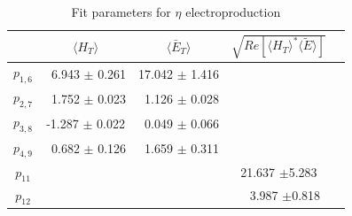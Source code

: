 \documentclass[prc,floatfix,superscriptaddress]{revtex4}
\newcommand{\GPDtE}{\langle \tilde{E} \rangle}
\newcommand{\GPDHT}{\langle H_T \rangle}
\newcommand{\ETbar}{\langle \bar{E}_T \rangle}
\begin{document}
\begin{table}[h!]
\caption{Fit parameters for $\eta$ electroproduction}
\begin{tabular}{   | c | c | c |  c | c |}
\hline
                  &  $\GPDHT$                  & $ \ETbar$ &  $\sqrt{Re[\GPDHT^*\GPDtE]}$    \\
\hline
$p_{1,6}$  & \ 6.943 $\pm$ 0.261  & 17.042  $\pm$ 1.416 &    \\
$p_{2,7}$  &\  1.752  $\pm$ 0.023& \ 1.126  $\pm$ 0.028&    \\
$p_{3,8}$   & -1.287  $\pm$ 0.022& \  0.049 $\pm$ 0.066&    \\
$p_{4,9}$  & \  0.682 $\pm$ 0.126 &\  1.659  $\pm$  0.311 &  \\
\hline
$p_{11}$  &   &   &   21.637  $\pm$5.283 \\
$p_{12}$  &   &   & \ \   3.987  $\pm$0.818 \\
\hline
\end{tabular}
\label{Tab:eta_fit_parameters}
\end{table}

\end{document}
